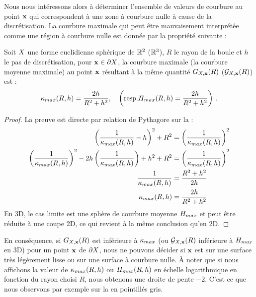Nous nous intéressons alors à déterminer l'ensemble de valeurs de courbure au
point $\mathbf{x}$ qui correspondent à une zone à courbure nulle à cause de la discrétisation. La
courbure maximale qui peut être mauvaisement interprétée comme une région à courbure nulle
est donnée par la propriété suivante :
%
\begin{property}
  Soit $X$ une forme euclidienne sphérique de $\mathbb{R}^2$ (\resp $\mathbb{R}^3$), $R$ le
  rayon de la boule et $h$ le pas de discrétisation, pour $\mathbf{x} \in \partial X$, la
  courbure maximale (\resp la courbure moyenne maximale) au point $\mathbf{x}$
  résultant à la même quantité $G_{X,\mathbf{x}}(R)$ (\resp $\mathcal{G}_{X,\mathbf{x}}(R)$) est :
  \begin{equation}
    \kappa_{max}(R,h) = \frac{2h}{R^2+h^2},
    \quad\left(\text{resp.} H_{max}(R,h) = \frac{2h}{R^2+h^2}\right)\,.
  \end{equation}
  \label{prop:minInterval}
\end{property}
\begin{proof}
  La preuve est directe par relation de Pythagore sur la  :
  \begin{align}
  	{\left(\frac{1}{\ensuremath{\kappa_{max}}(R,h)} - h\right)}^2 + R^2 &= {\left(\frac{1}{\kappa_{max}(R,h)}\right)}^2 \\
    {\left(\frac{1}{\kappa_{max}(R,h)}\right)}^2 - 2h\left(\frac{1}{\kappa_{max}(R,h)}\right) +h^2 + R^2 &= {\left(\frac{1}{\kappa_{max}(R,h)}\right)}^2 \\
    \frac{1}{\kappa_{max}(R,h)} &= \frac{R^2 + h^2}{2h} \\
  	\kappa_{max}(R,h) &= \frac{2h}{R^2+h^2}
  \end{align}
  En 3D, le cas limite est une sphère de courbure moyenne $H_{max}$ et peut
  être réduite à une coupe 2D, ce qui revient à la même conclusion qu'en 2D.
\end{proof}


En conséquence, si $G_{X,\mathbf{x}}(R)$ est inférieure à $\kappa_{max}$ (ou $\mathcal{G}_{X,\mathbf{x}}(R)$
inférieure à $H_{max}$ en 3D) pour un point $\mathbf{x}$ de $\partial X$, nous ne pouvons
décider si $\mathbf{x}$ est sur une surface très légèrement lisse ou sur une surface
à courbure nulle. À noter que si nous affichons la valeur de $\kappa_{max}(R,h)$ ou
$H_{max}(R,h)$ en échelle logarithmique en fonction du rayon choisi $R$,
nous obtenons une droite de pente $-2$. C'est ce que nous observons par exemple
sur la  en pointillés gris.


